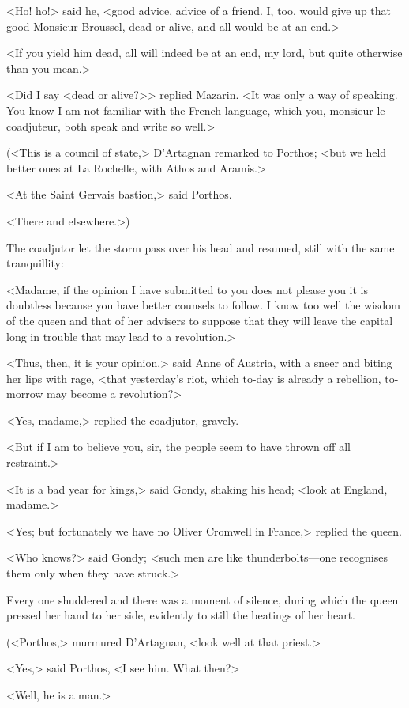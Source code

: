 <Ho! ho!> said he, <good advice, advice of a friend. I, too, would give up that good Monsieur Broussel, dead or alive, and all would be at an end.>

<If you yield him dead, all will indeed be at an end, my lord, but quite otherwise than you mean.>

<Did I say <dead or alive?>> replied Mazarin. <It was only a way of speaking. You know I am not familiar with the French language, which you, monsieur le coadjuteur, both speak and write so well.>

(<This is a council of state,> D'Artagnan remarked to Porthos; <but we held better ones at La Rochelle, with Athos and Aramis.>

<At the Saint Gervais bastion,> said Porthos.

<There and elsewhere.>)

The coadjutor let the storm pass over his head and resumed, still with the same tranquillity:

<Madame, if the opinion I have submitted to you does not please you it is doubtless because you have better counsels to follow. I know too well the wisdom of the queen and that of her advisers to suppose that they will leave the capital long in trouble that may lead to a revolution.>

<Thus, then, it is your opinion,> said Anne of Austria, with a sneer and biting her lips with rage, <that yesterday's riot, which to-day is already a rebellion, to-morrow may become a revolution?>

<Yes, madame,> replied the coadjutor, gravely.

<But if I am to believe you, sir, the people seem to have thrown off all restraint.>

<It is a bad year for kings,> said Gondy, shaking his head; <look at England, madame.>

<Yes; but fortunately we have no Oliver Cromwell in France,> replied the queen.

<Who knows?> said Gondy; <such men are like thunderbolts—one recognises them only when they have struck.>

Every one shuddered and there was a moment of silence, during which the queen pressed her hand to her side, evidently to still the beatings of her heart.

(<Porthos,> murmured D'Artagnan, <look well at that priest.>

<Yes,> said Porthos, <I see him. What then?>

<Well, he is a man.>

